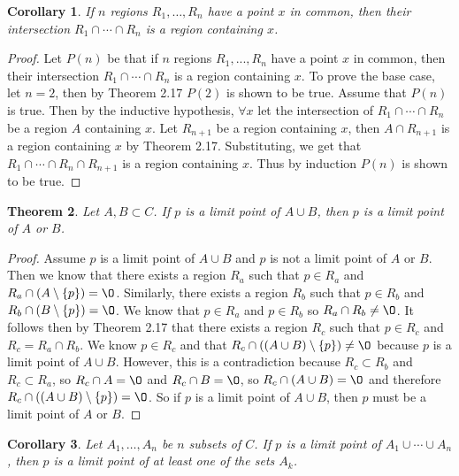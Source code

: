 \documentclass[12pt]{article}
\renewcommand{\emptyset}{\O}
\renewcommand{\_}[1]{\underline{ #1 }}
\newtheorem{theorem}{Theorem}[section]
\newtheorem{corollary}[theorem]{Corollary}
\theoremstyle{definition}
\numberwithin{equation}{subsection}
\begin{document}
\begin{corollary}  If $n$ regions $R_1, \dotsc, R_n$ have a point $x$ in common, then their intersection $R_1 \cap \dotsm \cap R_n$ is a region containing $x$.
\end{corollary}

\begin{proof}
Let $P(n)$ be that if $n$ regions $R_1,..., R_n$ have a point $x$ in common, then their intersection $R_1 \cap \dotsm \cap R_n$ is a region containing $x$. To prove the base case, let $n = 2$, then by Theorem 2.17 $P(2)$ is shown to be true. Assume that $P(n)$ is true. Then by the inductive hypothesis, $\forall x$ let the intersection of $R_1 \cap \dotsm \cap R_n$ be a region $A$ containing $x$. Let $R_{n+1}$ be a region containing $x$, then $A \cap R_{n+1}$ is a region containing $x$ by Theorem 2.17. Substituting, we get that $R_1 \cap \dotsm \cap R_n \cap R_{n+1}$ is a region containing $x$. Thus by induction $P(n)$ is shown to be true.
\end{proof}

\begin{theorem}  Let $A, B \subset C$.  If $p$ is a limit point of $A \cup B$, then $p$ is a limit point of $A$ or $B$.
\end{theorem}

\begin{proof}
Assume $p$ is a limit point of $A \cup B$ and $p$ is not a limit point of $A$ or $B$. Then we know that there exists a region $R_a$ such that $p \in R_a$ and $R_a \cap (A \setminus \{p\}) = \emptyset$. Similarly, there exists a region $R_b$ such that $p \in R_b$ and $R_b \cap (B \setminus \{p\}) = \emptyset$. We know that $p \in R_a$ and $p \in R_b$ so $R_a \cap R_b \neq \emptyset$. It follows then by Theorem 2.17 that there exists a region $R_c$ such that $p \in R_c$ and $R_c = R_a \cap R_b$. We know $p \in R_c$ and that $R_c \cap ((A \cup B) \setminus \{p\}) \neq \emptyset$ because $p$ is a limit point of $A \cup B$. However, this is a contradiction because $R_c \subset R_b$ and $R_c \subset R_a$, so $R_c \cap A = \emptyset$ and $R_c \cap B = \emptyset$, so $R_c \cap (A \cup B) = \emptyset$ and therefore $R_c \cap ((A \cup B) \setminus \{p\}) = \emptyset$. So if $p$ is a limit point of $A \cup B$, then $p$ must be a limit point of $A$ or $B$.
\end{proof}

\begin{corollary}  Let $A_1, \dotsc, A_n$ be $n$ subsets of $C$.  If $p$ is a limit point of $A_1 \cup \dotsm \cup A_n$, then $p$ is a limit point of at least one of the sets $A_k$.
\end{corollary}
\end{document}

